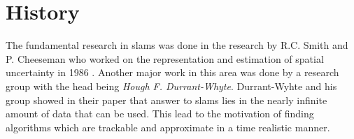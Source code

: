\section{History}
The fundamental research in \gls{slam}s was done in the research by R.C. Smith and P. Cheeseman who worked on the representation and estimation of spatial uncertainty in 1986 \cite{slamfordummies}. Another major work in this area was done by a research group with the head being \textit{Hough F. Durrant-Whyte}. Durrant-Wyhte and his group showed in their paper \cite{1678144} that answer to \gls{slam}s lies in the nearly infinite amount of data that can be used. This lead to the motivation of finding algorithms which are trackable and approximate in a time realistic manner.\newline

